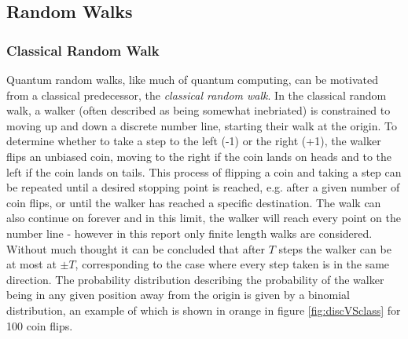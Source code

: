 \subsection{Random Walks}
\subsubsection{Classical Random Walk}
Quantum random walks, like much of quantum computing, can be motivated from a classical predecessor, the \emph{classical random walk}.
In the classical random walk, a walker (often described as being somewhat inebriated) is constrained to moving up and down a discrete number line, starting their walk at the origin.
To determine whether to take a step to the left (-1) or the right (+1), the walker flips an unbiased coin, moving to the right if the coin lands on heads and to the left if the coin lands on tails. 
This process of flipping a coin and taking a step can be repeated until a desired stopping point is reached, e.g. after a given number of coin flips, or until the walker has reached a specific destination.
The walk can also continue on forever and in this limit, the walker will reach every point on the number line - however in this report only finite length walks are considered.
Without much thought it can be concluded that after $T$ steps the walker can be at most at $\pm T$, corresponding to the case where every step taken is in the same direction.
The probability distribution describing the probability of the walker being in any given position away from the origin is given by a binomial distribution, an example of which is shown in orange in figure \ref{fig:discVSclass} for 100 coin flips. 

